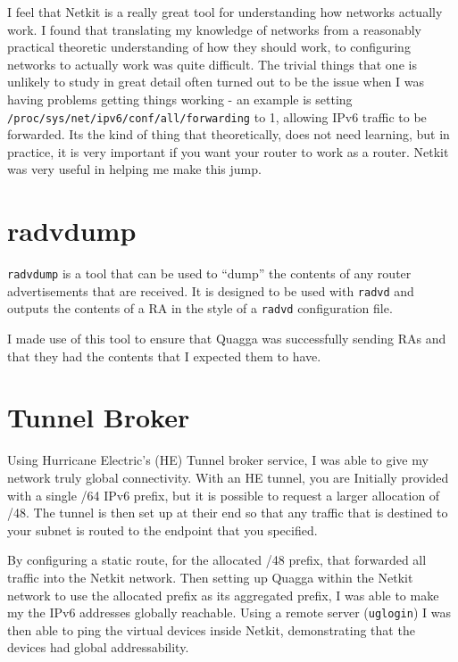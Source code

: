\documentclass[12pt]{report}
\begin{document}
I feel that Netkit is a really great tool for understanding how networks
actually work. I found that translating my knowledge of networks from a
reasonably practical theoretic understanding of how they should work, to
configuring networks to actually work was quite difficult. The trivial things
that one is unlikely to study in great detail often turned out to be the issue
when I was having problems getting things working - an example is setting
\texttt{/proc/sys/net/ipv6/conf/all/forwarding} to 1, allowing IPv6 traffic to
be forwarded. Its the kind of thing that theoretically,  does not need learning,
but in practice, it is very important if you want your router to work as a
router. Netkit was very useful in helping me make this jump. 


\section{radvdump}
\texttt{radvdump} is a tool that can be used to ``dump'' the contents of any
router advertisements that are received. It is designed to be used with
\texttt{radvd} and outputs the contents of a RA in the style of a
\texttt{radvd} configuration file. 

I made use of this tool to ensure that Quagga was successfully sending RAs and
that they had the contents that I expected them to have. 


\section{Tunnel Broker}
Using Hurricane Electric's (HE) Tunnel broker service, I was able to give my
network truly global connectivity. With an HE tunnel, you are Initially
provided with a single /64 IPv6 prefix, but it is possible to request a larger
allocation of /48. The tunnel is then set up at their end so that any traffic
that is destined to your subnet is routed to the endpoint that you specified.  

By configuring a static route, for the allocated /48 prefix, that forwarded all
traffic into the Netkit network. Then setting up Quagga within the Netkit
network to use the allocated prefix as its aggregated prefix, I was able to
make my the IPv6 addresses globally reachable. Using a remote server
(\texttt{uglogin}) I was then able to ping the virtual devices inside Netkit,
demonstrating that the devices had global addressability.
\end{document}
